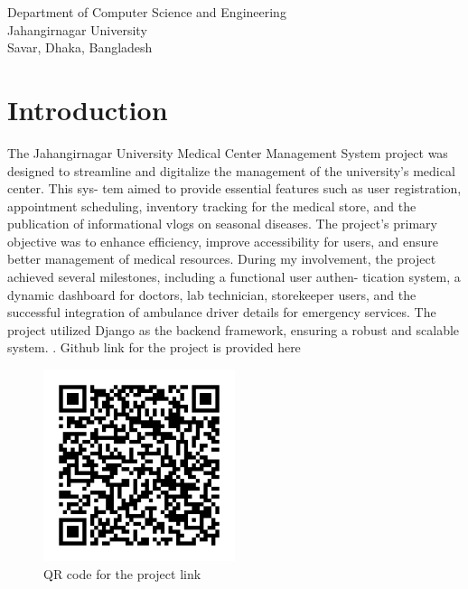 \documentclass[a4paper,12pt]{article}
\begin{document}
\begin{center}
\begin{table}[h!]
\begin{tabular}{|c|c|c|c|}
        \end{tabular}
    \end{table}

    \vspace{1cm}

    Department of Computer Science and Engineering\\
    Jahangirnagar University\\
    Savar, Dhaka, Bangladesh\\
\end{center}

\newpage

\tableofcontents

\newpage
\pagestyle{fancy}
\fancyhf{}
\fancyfoot[C]{\thepage} %
\section{Introduction}
The Jahangirnagar University Medical Center Management System project was designed
to streamline and digitalize the management of the university’s medical center. This sys-
tem aimed to provide essential features such as user registration, appointment scheduling,
inventory tracking for the medical store, and the publication of informational vlogs on
seasonal diseases. The project’s primary objective was to enhance efficiency, improve
accessibility for users, and ensure better management of medical resources. During my
involvement, the project achieved several milestones, including a functional user authen-
tication system, a dynamic dashboard for doctors, lab technician, storekeeper users, and
the successful integration of ambulance driver details for emergency services. The project
utilized Django as the backend framework, ensuring a robust and scalable system. .
Github link for the project is provided here
\begin{figure}[H]
    \centering
    \includegraphics[width=0.5\textwidth]{images/simple_prcode.png}
    \caption{QR code for the project link}
    \label{fig:qrcode}
\end{figure}
\end{document}
